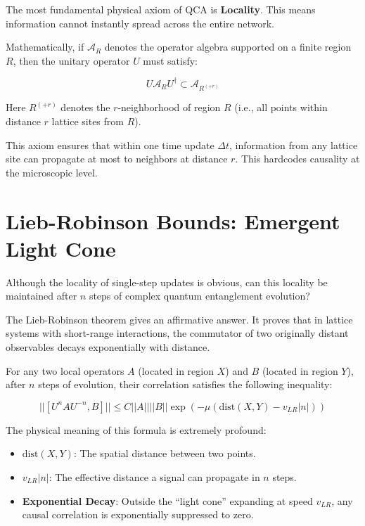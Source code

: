 The most fundamental physical axiom of QCA is \textbf{Locality}. This means information cannot instantly spread across the entire network.

Mathematically, if $\mathcal{A}_R$ denotes the operator algebra supported on a finite region $R$, then the unitary operator $U$ must satisfy:

\[U \mathcal{A}_R U^{\dagger} \subset \mathcal{A}_{R^{(+r)}}\]

Here $R^{(+r)}$ denotes the $r$-neighborhood of region $R$ (i.e., all points within distance $r$ lattice sites from $R$).

This axiom ensures that within one time update $\Delta t$, information from any lattice site can propagate at most to neighbors at distance $r$. This hardcodes causality at the microscopic level.

\section{Lieb-Robinson Bounds: Emergent Light Cone}

Although the locality of single-step updates is obvious, can this locality be maintained after $n$ steps of complex quantum entanglement evolution?

The Lieb-Robinson theorem gives an affirmative answer. It proves that in lattice systems with short-range interactions, the commutator of two originally distant observables decays exponentially with distance.

For any two local operators $A$ (located in region $X$) and $B$ (located in region $Y$), after $n$ steps of evolution, their correlation satisfies the following inequality:

\[|| [U^n A U^{-n}, B] || \le C ||A|| ||B|| \exp\left( -\mu ( \text{dist}(X, Y) - v_{LR} |n| ) \right)\]

The physical meaning of this formula is extremely profound:

\begin{itemize}
\item \textbf{$\text{dist}(X, Y)$}: The spatial distance between two points.

\item \textbf{$v_{LR} |n|$}: The effective distance a signal can propagate in $n$ steps.

\item \textbf{Exponential Decay}: Outside the ``light cone'' expanding at speed $v_{LR}$, any causal correlation is exponentially suppressed to zero.
\end{itemize}

